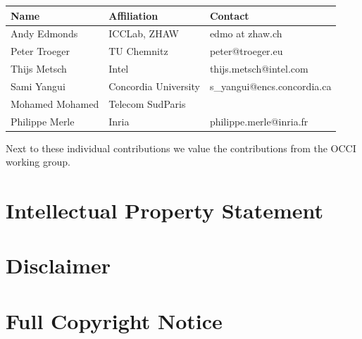 \documentclass[10pt,a4paper]{article}
\begin{document}
\begin{tabular}{l|p{2in}|p{2in}}
Name & Affiliation & Contact \\
\hline
Andy Edmonds & ICCLab, ZHAW & edmo at zhaw.ch \\
Peter Troeger & TU Chemnitz & peter@troeger.eu \\
Thijs Metsch & Intel & thijs.metsch@intel.com\\
Sami Yangui & Concordia University & s\_yangui@encs.concordia.ca \\
Mohamed Mohamed & Telecom SudParis & \\
Philippe Merle & Inria & philippe.merle@inria.fr \\
\end{tabular}

Next to these individual contributions we value the contributions from
the OCCI working group.

\section{Intellectual Property Statement}


\section{Disclaimer}


\section{Full Copyright Notice}




\end{document}
